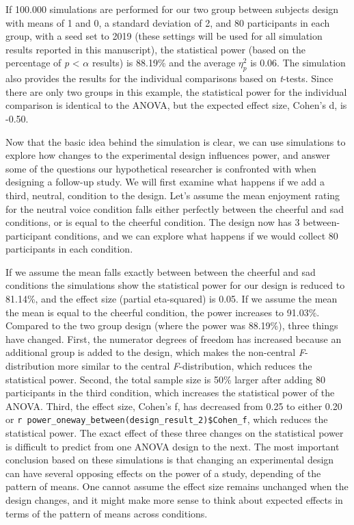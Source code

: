 \documentclass[
  ,jou,floatsintext]{apa6}
\begin{document}
If 100.000 simulations are performed for our two group between subjects design with means of 1 and 0, a standard deviation of 2, and 80 participants in each group, with a seed set to 2019 (these settings will be used for all simulation results reported in this manuscript), the statistical power (based on the percentage of \emph{p} \textless{} \(\alpha\) results) is 88.19\% and the average \(\eta_p^2\) is 0.06.
The simulation also provides the results for the individual comparisons based on \emph{t}-tests.
Since there are only two groups in this example, the statistical power for the individual comparison is identical to the ANOVA, but the expected effect size, Cohen's d, is -0.50.

Now that the basic idea behind the simulation is clear, we can use simulations to explore how changes to the experimental design influences power, and answer some of the questions our hypothetical researcher is confronted with when designing a follow-up study.
We will first examine what happens if we add a third, neutral, condition to the design.
Let's assume the mean enjoyment rating for the neutral voice condition falls either perfectly between the cheerful and sad conditions, or is equal to the cheerful condition.
The design now has 3 between-participant conditions, and we can explore what happens if we would collect 80 participants in each condition.

If we assume the mean falls exactly between between the cheerful and sad conditions the simulations show the statistical power for our design is reduced to 81.14\%, and the effect size (partial eta-squared) is 0.05.
If we assume the mean the mean is equal to the cheerful condition, the power increases to 91.03\%.
Compared to the two group design (where the power was 88.19\%), three things have changed.
First, the numerator degrees of freedom has increased because an additional group is added to the design, which makes the non-central \emph{F}-distribution more similar to the central \emph{F}-distribution, which reduces the statistical power.
Second, the total sample size is 50\% larger after adding 80 participants in the third condition, which increases the statistical power of the ANOVA.
Third, the effect size, Cohen's f, has decreased from 0.25 to either 0.20 or \texttt{r\ power\_oneway\_between(design\_result\_2)\$Cohen\_f}, which reduces the statistical power.
The exact effect of these three changes on the statistical power is difficult to predict from one ANOVA design to the next.
The most important conclusion based on these simulations is that changing an experimental design can have several opposing effects on the power of a study, depending of the pattern of means.
One cannot assume the effect size remains unchanged when the design changes, and it might make more sense to think about expected effects in terms of the pattern of means across conditions.
\end{document}

